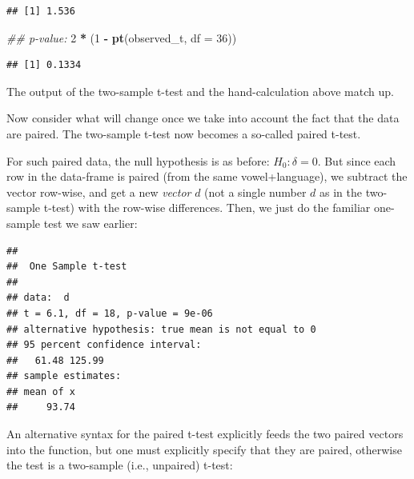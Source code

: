 \documentclass[12pt,]{krantz}
\newenvironment{Shaded}{\begin{snugshade}}{\end{snugshade}}
\newcommand{\CommentTok}[1]{\textcolor[rgb]{0.56,0.35,0.01}{\textit{#1}}}
\newcommand{\DataTypeTok}[1]{\textcolor[rgb]{0.13,0.29,0.53}{#1}}
\newcommand{\DecValTok}[1]{\textcolor[rgb]{0.00,0.00,0.81}{#1}}
\newcommand{\KeywordTok}[1]{\textcolor[rgb]{0.13,0.29,0.53}{\textbf{#1}}}
\newcommand{\NormalTok}[1]{#1}
\newcommand{\OperatorTok}[1]{\textcolor[rgb]{0.81,0.36,0.00}{\textbf{#1}}}
\newcommand{\StringTok}[1]{\textcolor[rgb]{0.31,0.60,0.02}{#1}}
\begin{document}
\begin{verbatim}
## [1] 1.536
\end{verbatim}

\begin{Shaded}
\begin{Highlighting}[]
\CommentTok{## p-value:}
\DecValTok{2} \OperatorTok{*}\StringTok{ }\NormalTok{(}\DecValTok{1} \OperatorTok{-}\StringTok{ }\KeywordTok{pt}\NormalTok{(observed_t, }\DataTypeTok{df =} \DecValTok{36}\NormalTok{))}
\end{Highlighting}
\end{Shaded}

\begin{verbatim}
## [1] 0.1334
\end{verbatim}

The output of the two-sample t-test and the hand-calculation above match up.

Now consider what will change once we take into account the fact that the data are paired. The two-sample t-test now becomes a so-called paired t-test.

For such paired data, the null hypothesis is as before: \(H_0: \delta=0\). But since each row in the data-frame is paired (from the same vowel+language), we subtract the vector row-wise, and get a new \emph{vector} \(d\) (not a single number \(d\) as in the two-sample t-test) with the row-wise differences. Then, we just do the familiar one-sample test we saw earlier:

\begin{Shaded}
\end{Shaded}

\begin{verbatim}
## 
## 	One Sample t-test
## 
## data:  d
## t = 6.1, df = 18, p-value = 9e-06
## alternative hypothesis: true mean is not equal to 0
## 95 percent confidence interval:
##   61.48 125.99
## sample estimates:
## mean of x 
##     93.74
\end{verbatim}

An alternative syntax for the paired t-test explicitly feeds the two paired vectors into the function, but one must explicitly specify that they are paired, otherwise the test is a two-sample (i.e., unpaired) t-test:
\end{document}
